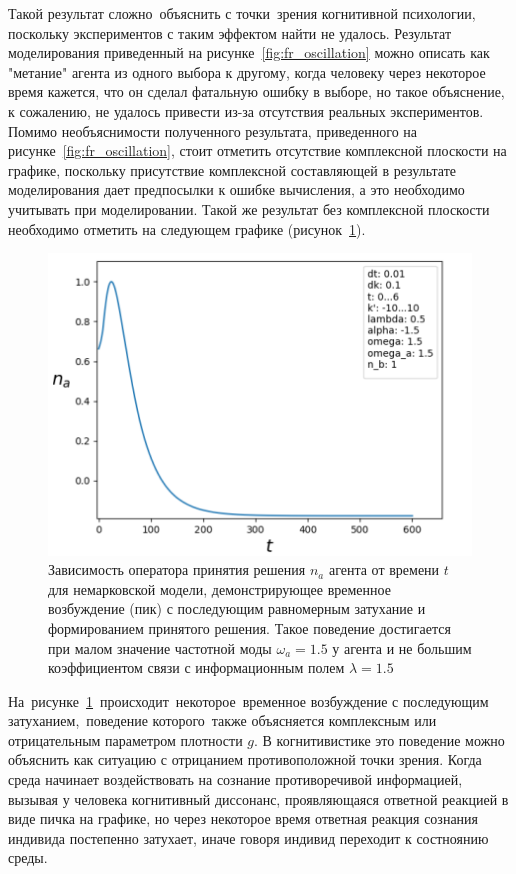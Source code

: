 Такой результат сложно~объяснить с точки~зрения когнитивной психологии, поскольку экспериментов с таким
эффектом найти не удалось.
Результат моделирования приведенный на рисунке~\ref{fig:fr_oscillation} можно описать как "метание"
агента из одного выбора к другому, когда человеку через некоторое время кажется, что он сделал фатальную
ошибку в выборе, но такое объяснение, к сожалению, не удалось привести из-за отсутствия реальных
экспериментов.
Помимо необъяснимости полученного результата, приведенного на рисунке~\ref{fig:fr_oscillation}, стоит
отметить отсутствие комплексной плоскости на графике, поскольку присутствие комплексной составляющей
в результате моделирования дает предпосылки к ошибке вычисления, а это необходимо учитывать при моделировании.
Такой же результат без комплексной плоскости необходимо отметить на следующем графике (рисунок~\ref{fig:fr_next}).
\begin{figure}[h!]
    \centering
    \captionsetup{justification=centering}
    \includegraphics[width=0.7\linewidth]{pictures/result_first_2.png}
    \caption{Зависимость оператора принятия решения $n_{a}$ агента от времени $t$ для немарковской модели,
    демонстрирующее временное возбуждение (пик) с последующим равномерным затухание и формированием
    принятого решения. Такое поведение достигается при малом значение частотной моды $\omega_{a} = 1.5$ у
    агента и не большим коэффициентом связи с информационным полем $\lambda = 1.5$}
    \label{fig:fr_next}
\end{figure}

На~рисунке~\ref{fig:fr_next}~происходит~некоторое~временное возбуждение с последующим затуханием,~поведение
которого~также объясняется комплексным или отрицательным параметром плотности $g$.
В когнитивистике это поведение можно объяснить как ситуацию с отрицанием противоположной точки зрения.
Когда среда начинает воздействовать на сознание противоречивой информацией, вызывая у человека когнитивный
диссонанс, проявляющаяся ответной реакцией в виде пичка на графике, но через некоторое время ответная
реакция сознания индивида постепенно затухает, иначе говоря индивид переходит к состноянию среды.

